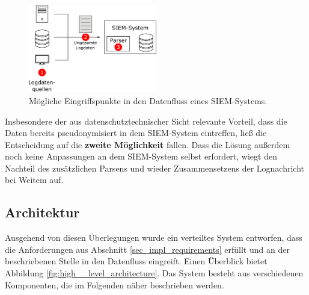 \begin{figure}[]
    \centering
        \includegraphics[width=0.5\textwidth]{dia/siem_data_access_point.pdf}
    \caption{Mögliche Eingriffspunkte in den Datenfluss eines SIEM-Systems.}
    \label{fig:siem_data_access_point}
\end{figure}

Insbesondere der aus datenschutztechnischer Sicht relevante Vorteil, dass die Daten bereits pseudonymisiert in dem SIEM-System eintreffen, ließ die Entscheidung auf die \textbf{zweite Möglichkeit} fallen. 
Dass die Lösung außerdem noch keine Anpassungen an dem SIEM-System selbst erfordert, wiegt den Nachteil des zusätzlichen Parsens und wieder Zusammensetzens der Lognachricht bei Weitem auf.



\subsection{Architektur}

%


Ausgehend von diesen Überlegungen wurde ein verteiltes System entworfen, dass die Anforderungen aus Abschnitt \ref{sec_impl_requirements} erfüllt und an der beschriebenen Stelle in den Datenfluss eingreift. 
Einen Überblick bietet Abbildung \ref{fig:high__level_architecture}. Das System besteht aus verschiedenen Komponenten, die im Folgenden näher beschrieben werden.

